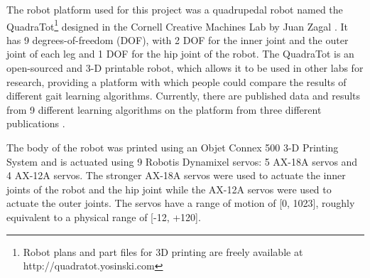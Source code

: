 The robot platform used for this project was a quadrupedal robot named the QuadraTot\footnote{Robot plans and part files for 3D printing are freely available at http://quadratot.yosinski.com} designed in the Cornell Creative Machines Lab by Juan Zagal \cite{yos:clune}.
It has 9 degrees-of-freedom (DOF), with 2 DOF for the inner joint and the outer joint of each leg and 1 DOF for the hip joint of the robot. 
The QuadraTot is an open-sourced and 3-D printable robot, which allows it to be used in other labs for research, providing a platform with which people could compare the results of different gait learning algorithms. 
Currently, there are published data and results from 9 different learning algorithms on the platform from three different publications \cite{yos:clune,glette,haocheng}. %


The body of the robot was printed using an Objet Connex 500 3-D Printing System and is actuated using 9 Robotis Dynamixel servos: 5 AX-18A servos and 4 AX-12A servos. 
The stronger AX-18A servos were used to actuate the inner joints of the robot and the hip joint while the AX-12A servos were used to actuate the outer joints. 
The servos have a range of motion of [0, 1023], roughly equivalent to a physical range of [-12\degree, +120\degree]. 

